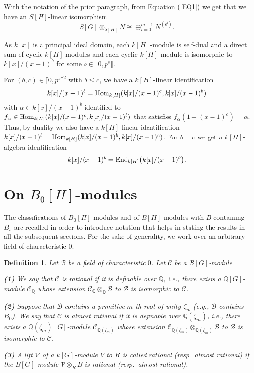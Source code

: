 \documentclass[11pt]{amsart}
\newtheorem{definition}[theorem]{Definition}
\def\End{\textup{End}}
\def\Hom{\textup{Hom}}
\begin{document}
With the notation of the prior paragraph, from Equation (\ref{EQ1}) we get that we have an $S[H]$-linear isomorphism
$$S[G]\otimes_{S[H]} N\cong\oplus_{i=0}^{m-1} N^{(\epsilon^i)}.$$

As $k[x]$ is a principal ideal domain, each $k[H]$-module is self-dual and a direct sum of cyclic $k[H]$-modules and each cyclic $k[H]$-module is isomorphic to $k[x]/(x-1)^b$ for some $b\in\llbracket0,p^s\rrbracket$.

For $(b,c)\in\llbracket0,p^s\rrbracket^2$ with $b\le c$, we have a $k[H]$-linear identification
\begin{equation}\label{EQ17}
k[x]/(x-1)^b=\Hom_{k[H]}(k[x]/(x-1)^c,k[x]/(x-1)^b)
\end{equation}
with $\alpha\in k[x]/(x-1)^b$ identified to $f_{\alpha}\in \Hom_{k[H]}(k[x]/(x-1)^c,k[x]/(x-1)^b)$ that satisfies $f_{\alpha}(1+(x-1)^c)=\alpha$. Thus, by duality we also have a $k[H]$-linear identification
$k[x]/(x-1)^b=\Hom_{k[H]}(k[x]/(x-1)^b,k[x]/(x-1)^c)$. For $b=c$ we get a $k[H]$-algebra identification
\begin{equation}\label{EQ18}
k[x]/(x-1)^b=\End_{k[H]}\bigl(k[x]/(x-1)^b\bigr).
\end{equation}

\section{On $B_0[H]$-modules}\label{S3}

The classifications of $B_0[H]$-modules and of $B[H]$-modules with $B$ containing $B_s$ are recalled in order to introduce notation that helps in stating the results in all the subsequent sections. For the sake of generality, we work over an arbitrary field of characteristic $0$.

\begin{definition}\label{D2}
Let $\mathcal B$ be a field of characteristic $0$. Let $\mathcal C$ be a $\mathcal B[G]$-module.

\medskip
{\bf (1)} We say that $\mathcal C$ is rational if it is definable over $\mathbb Q$, i.e., there exists a $\mathbb Q[G]$-module $\mathcal C_{\mathbb Q}$ whose extension $\mathcal C_{\mathbb Q}\otimes_{\mathbb Q} \mathcal B$ to $\mathcal B$ is isomorphic to $\mathcal C$.

\smallskip
{\bf (2)} Suppose that $\mathcal B$ contains a primitive $m$-th root of unity $\zeta_m$ (e.g., $\mathcal B$ contains $B_0$). We say that $\mathcal C$ is almost rational if it is definable over $\mathbb Q(\zeta_m)$, i.e., there exists a $\mathbb Q(\zeta_m)[G]$-module $\mathcal C_{\mathbb Q(\zeta_m)}$ whose extension $\mathcal C_{\mathbb Q(\zeta_m)}\otimes_{\mathbb Q(\zeta_m)} \mathcal B$ to $\mathcal B$ is isomorphic to $\mathcal C$.

\smallskip
{\bf (3)} A lift $\mathcal V$ of a $k[G]$-module $V$ to $R$ is called rational (resp.\ almost rational) if the $B[G]$-module $\mathcal V\otimes_R B$ is rational (resp.\ almost rational).
\end{definition}
\end{document}
